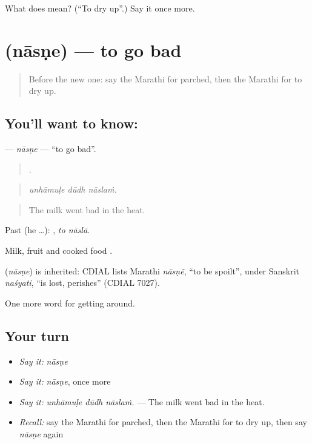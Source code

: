 \begin{tcolorbox}[breakable,colback=teal!4,colframe=teal!35!black,title={Before you move on}]
What does  mean? (\textquotedblleft{}To dry up\textquotedblright{}.) Say it once more.
\end{tcolorbox}
\section[\texorpdfstring{\mr{नासणे} (nāsṇe)}{नासणे (nāsṇe)}]{ (nāsṇe) — to go bad}

\label{lesson:MR-C435-nasne}



\begin{quote}
Before the new one: say the Marathi for parched, then the Marathi for to dry up.
\end{quote}

\subsection*{You'll want to know: }
\textbf{} — \emph{nāsṇe} — \textquotedblleft{}to go bad\textquotedblright{}.

\begin{quote}
  .
\end{quote}

\begin{quote}
\emph{unhāmuḷe dūdh nāslaṁ.}
\end{quote}

\begin{quote}
The milk went bad in the heat.
\end{quote}

Past (he …):  , \emph{to nāslā}.

Milk, fruit and cooked food .

\begin{cousinweb}
\textbf{} (\emph{nāsṇe}) is inherited: CDIAL lists Marathi \emph{nāsṇẽ}, \textquotedblleft{}to be spoilt\textquotedblright{}, under Sanskrit \emph{naśyati}, \textquotedblleft{}is lost, perishes\textquotedblright{} (CDIAL 7027).
\end{cousinweb}

\begin{grammarlens}[title={What you've built}]
One more word for getting around.
\end{grammarlens}

\subsection*{Your turn}
\begin{itemize}
\raggedright
  \item \emph{Say it:} \emph{nāsṇe}
  \item \emph{Say it:} \emph{nāsṇe}, once more
  \item \emph{Say it:} \emph{unhāmuḷe dūdh nāslaṁ.} — The milk went bad in the heat.
  \item \emph{Recall:} say the Marathi for parched, then the Marathi for to dry up, then say \emph{nāsṇe} again
\end{itemize}

